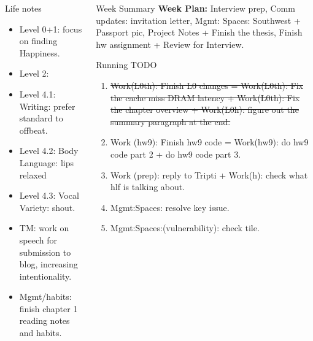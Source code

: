 \documentclass[serif, mathserif, final]{beamer}
\newcommand{\doneTask}[1]{\tiny \item \tiny \sout{#1}}
\begin{document}
\begin{frame}{}
\begin{columns}
\begin{column}{0.25\linewidth}
  \begin{block}{Life notes} 
    \begin{itemize} 
      \tiny \item \tiny Level 0+1: focus on finding Happiness. 
    \item \tiny Level 2: 
    \item \tiny Level 4.1: Writing: prefer standard to offbeat. 
    \item \tiny Level 4.2: Body Language: lips relaxed
    \item \tiny Level 4.3: Vocal Variety: shout. 
    \item \tiny TM: work on speech for submission to blog, increasing intentionality. 
    \item \tiny Mgmt/habits: finish chapter 1 reading notes and habits. 
    \end{itemize}     
  \end{block}
\end{column} %

\begin{column}{0.50\linewidth}

  \begin{block}{Week Summary}
    \textbf{Week Plan:} Interview prep, Comm updates: invitation
    letter, Mgmt: Spaces: Southwest + Passport pic, 
    Project Notes + Finish the thesis, Finish hw
    assignment + Review for Interview. \\
  \end{block} 

  \begin{block}{Running TODO} %
    \begin{enumerate} 
      \doneTask{Work(L0th): Finish L0 changes = Work(L0th):
      Fix the cache miss DRAM latency + Work(L0th): Fix the chapter
      overview + Work(L0h): figure out the summary paragraph at the
      end.}
    \item \tiny Work (hw9): Finish hw9 code = Work(hw9): do hw9 code
      part 2 + do hw9 code part 3. 
    \item \tiny Work (prep): reply to Tripti + Work(h): check what hlf
      is talking about. 
    \item \tiny Mgmt:Spaces: resolve key issue. 
    \item \tiny Mgmt:Spaces:(vulnerability): check tile. 
   \end{enumerate}
  \end{block} 




\end{column}
\end{columns}
\end{frame}
\end{document}
